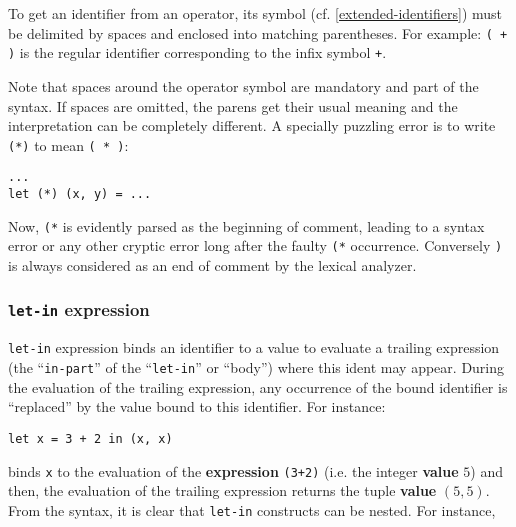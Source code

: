 To get an identifier from an operator, its symbol
(cf. \ref{extended-identifiers}) must be delimited by spaces and enclosed
into matching parentheses.
For example: {\tt (\ + )} is the regular identifier corresponding to the
infix symbol {\tt +}.

Note that spaces around the operator symbol are mandatory and part of the
syntax. If spaces are omitted, the parens get their usual meaning and the
interpretation can be completely different.
A specially puzzling error is to write {\tt (*)} to mean {\tt ( * )}:

{\scriptsize
\begin{lstlisting}
...
let (*) (x, y) = ...
\end{lstlisting}}

Now, {\tt (*} is evidently parsed as the beginning of comment,
leading to a syntax error or any other cryptic error long after the faulty
{\tt (*} occurrence.
Conversely {\tt *)} is always considered as an end of comment by the lexical
analyzer.




\subsubsection{{\tt let-in} expression}
{\tt let-in} expression binds an identifier to a value to
evaluate a trailing expression (the ``{\tt in-part}'' of the ``{\tt let-in}''
or ``body'') where this ident may appear. During the evaluation of the
trailing expression, any occurrence of the bound identifier is ``replaced''
by the value bound to this identifier. For instance:

{\scriptsize
\begin{lstlisting}
let x = 3 + 2 in (x, x)
\end{lstlisting}}

\noindent binds {\tt x} to the evaluation of the {\bf expression} {\tt (3+2)}
(i.e. the integer {\bf value} $5$) and then, the evaluation of the
trailing expression returns the tuple {\bf value} $(5, 5)$.  From the
syntax, it is clear that {\tt let-in} constructs can be nested.  For
instance,

